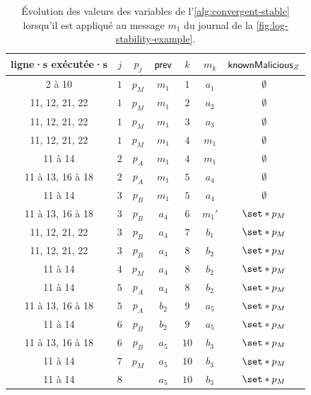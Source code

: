 \begin{table}[ht]
    \centering
    \begin{tabular}{ccccccc}
        ligne·s exécutée·s & $j$ & $p_j$ & $\operatorname{\mathsf{prev}}$ & $k$ & $m_k$ & $\operatorname{\mathsf{knownMalicious}}_Z$ \\
        \toprule
        2 à 10 & $1$ & $p_M$ & $m_1$ & $1$ & $a_1$ & $\emptyset$ \\
        11, 12, 21, 22 & $1$ & $p_M$ & $m_1$ & $2$ & $a_2$ & $\emptyset$ \\
        11, 12, 21, 22 & $1$ & $p_M$ & $m_1$ & $3$ & $a_3$ & $\emptyset$ \\
        11, 12, 21, 22 & $1$ & $p_M$ & $m_1$ & $4$ & $m_1$ & $\emptyset$ \\
        11 à 14 & $2$ & $p_A$ & $m_1$ & $4$ & $m_1$ & $\emptyset$ \\
        11 à 13, 16 à 18 & $2$ & $p_A$ & $m_1$ & $5$ & $a_4$ & $\emptyset$ \\
        11 à 14 & $3$ & $p_B$ & $m_1$ & $5$ & $a_4$ & $\emptyset$ \\
        11 à 13, 16 à 18 & $3$ & $p_B$ & $a_4$ & $6$ & $m_1'$ & $\set*{p_M}$ \\
        11, 12, 21, 22 & $3$ & $p_B$ & $a_4$ & $7$ & $b_1$ & $\set*{p_M}$ \\
        11, 12, 21, 22 & $3$ & $p_B$ & $a_4$ & $8$ & $b_2$ & $\set*{p_M}$ \\
        11 à 14 & $4$ & $p_M$ & $a_4$ & $8$ & $b_2$ & $\set*{p_M}$ \\
        11 à 14 & $5$ & $p_A$ & $a_4$ & $8$ & $b_2$ & $\set*{p_M}$ \\
        11 à 13, 16 à 18 & $5$ & $p_A$ & $b_2$ & $9$ & $a_5$ & $\set*{p_M}$ \\
        11 à 14 & $6$ & $p_B$ & $b_2$ & $9$ & $a_5$ & $\set*{p_M}$ \\
        11 à 13, 16 à 18 & $6$ & $p_B$ & $a_5$ & $10$ & $b_3$ & $\set*{p_M}$ \\
        11 à 14 & $7$ & $p_M$ & $a_5$ & $10$ & $b_3$ & $\set*{p_M}$ \\
        11 à 14 & $8$ & & $a_5$ & $10$ & $b_3$ & $\set*{p_M}$ \\
    \end{tabular}
    \caption{Évolution des valeurs des variables de l'\autoref{alg:convergent-stable} lorsqu'il est appliqué au message $m_1$ du journal de la \autoref{fig:log-stability-example}.}\label{tab:log-stability-example-algo-loop}
\end{table}




